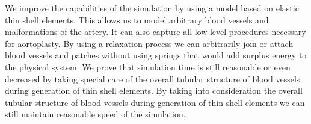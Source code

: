We improve the capabilities of the simulation by using a model based on elastic thin shell elements.
This allows us to model arbitrary blood vessels and malformations of the artery.
It can also capture all low-level procedures necessary for aortoplasty.
By using a relaxation process we can arbitrarily join or attach blood vessels and patches without using springs that would add surplus energy to the physical system.
We prove that simulation time is still reasonable or even decreased by taking special care of the overall tubular structure of blood vessels during generation of thin shell elements.
By taking into consideration the overall tubular structure of blood vessels during generation of thin shell elements we can still maintain reasonable speed of the simulation.
\tomas{)}

